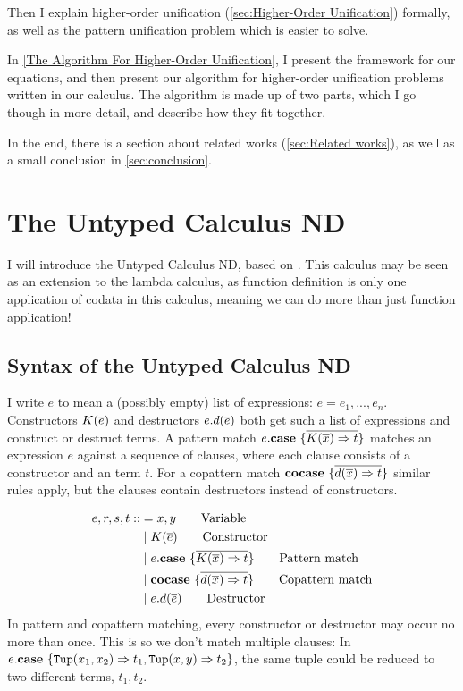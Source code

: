 \documentclass[twoside,12pt,a4paper]{article}
\begin{document}
Then I explain higher-order unification (\cref{sec:Higher-Order Unification}) formally, as well as the pattern unification problem which is easier to solve.

In \cref{The Algorithm For Higher-Order Unification}, I present the framework for our equations, 
and then present our algorithm for higher-order unification problems written in our calculus.
The algorithm is made up of two parts, which I go though in more detail, and describe how they fit together.

In the end, there is a section about related works (\cref{sec:Related works}), as well as a small conclusion in \cref{sec:conclusion}.

\section{The Untyped Calculus ND}\label{sec:The Untyped Calculus ND}

I will introduce the Untyped Calculus ND, based on \cite{binder2024programming}.
This calculus may be seen as an extension to the lambda calculus, as function definition is only one application of codata in this calculus,
meaning we can do more than just function application! 

\subsection{Syntax of the Untyped Calculus ND}\label{sec:syntax}

I write $\overline{e}$ to mean a (possibly empty) list of expressions: $\overline{e}= e_1, ..., e_n$.  
Constructors $K(\overline{e})$ and destructors $e.d(\overline{e})$ both get such a list of expressions and construct or destruct terms.
A pattern match $e.\textbf{case}\ \{\overline{K(\overline{x})\Rightarrow t}\}$ matches an expression $e$ against a sequence of clauses, where each clause consists of a constructor and an term $t$.
For a copattern match $\textbf{cocase}\ \{\overline{d(\overline{x})\Rightarrow t}\}$
similar rules apply, but the clauses contain destructors instead of constructors.

\begin{definition}
    \begin{align*}
    e,r,s,t ::&=  x,y  \tag*{Variable} \\
        &\;|\;K(\overline{e}) \tag*{Constructor} \\
        &\;|\;e.\textbf{case}\ \{\overline{K(\overline{x})\Rightarrow t}\}  \tag*{Pattern match}\\
        &\;|\;\textbf{cocase}\ \{\overline{d(\overline{x})\Rightarrow t}\}  \tag*{Copattern match}\\
        &\;|\;e.d(\overline{e})  \tag*{Destructor}
    \end{align*}
    In pattern and copattern matching, every constructor or destructor may occur no more than once.
    This is so we don't match multiple clauses:
    In $e.\textbf{case}\ \{\mathtt{Tup(}x_1, x_2\mathtt{)}\Rightarrow t_1, \mathtt{Tup(}x, y\mathtt{)}\Rightarrow t_2\}$, the same tuple could be reduced to two different terms, $t_1, t_2$.
\end{definition}
\end{document}
